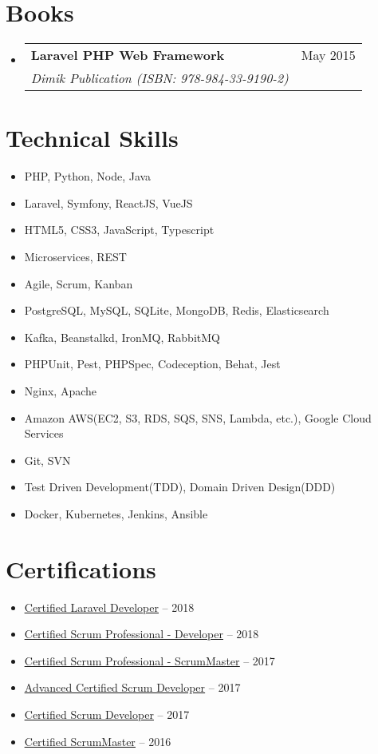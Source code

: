 \documentclass[a4paper,11pt]{article}
\makeatletter
\newcommand{\resumeItem}[1]{
  \item\small{
    {#1 \vspace{-2pt}}
  }
}
\newcommand{\resumeSubheading}[4]{
  \vspace{-2pt}\item
    \begin{tabular*}{0.97\textwidth}[t]{l@{\extracolsep{\fill}}r}
      \textbf{\large #1} \small{\textit{#4}} & #2 \\
      \textit{#3}
    \end{tabular*}\vspace{-7pt}
}
\newcommand{\resumeSubHeadingListStart}{\begin{itemize}[leftmargin=0.15in, label={}]}
\newcommand{\resumeSubHeadingListEnd}{\end{itemize}}
\newcommand{\resumeItemListStart}{\begin{itemize}}
\newcommand{\resumeItemListEnd}{\end{itemize}\vspace{-5pt}}
\makeatother
\begin{document}
\section{Books}
  \resumeSubHeadingListStart    
    \resumeSubheading
      {\textbf{Laravel PHP Web Framework}}{May 2015}
      {Dimik Publication (ISBN: 978-984-33-9190-2)} {}
  \resumeSubHeadingListEnd


\section{Technical Skills}
 \begin{itemize}[leftmargin=0.15in, label={}]    
    \resumeItemListStart
      \resumeItem{PHP, Python, Node, Java}
      \resumeItem{Laravel, Symfony, ReactJS, VueJS}
      \resumeItem{HTML5, CSS3, JavaScript, Typescript}
      \resumeItem{Microservices, REST}
      \resumeItem{Agile, Scrum, Kanban}
      \resumeItem{PostgreSQL, MySQL, SQLite, MongoDB, Redis, Elasticsearch}
      \resumeItem{Kafka, Beanstalkd, IronMQ, RabbitMQ}
      \resumeItem{PHPUnit, Pest, PHPSpec, Codeception, Behat, Jest}
      \resumeItem{Nginx, Apache}
      \resumeItem{Amazon AWS(EC2, S3, RDS, SQS, SNS, Lambda, etc.), Google Cloud Services}
      \resumeItem{Git, SVN}
      \resumeItem{Test Driven Development(TDD), Domain Driven Design(DDD)}
      \resumeItem{Docker, Kubernetes, Jenkins, Ansible}
    \resumeItemListEnd
 \end{itemize}
 

\section{Certifications}
  \begin{itemize}[leftmargin=0.15in, label={}]
      \resumeItemListStart
        \resumeItem{\href{https://exam.laravelcert.com/is/nuruzzaman-milon/certified-since/2018-01-08}{\underline{Certified Laravel Developer}} -- 2018}
        \resumeItem{\href{https://bcert.me/swoqnnlks}{\underline{Certified Scrum Professional - Developer}} -- 2018}
        \resumeItem{\href{https://bcert.me/swajseym}{\underline{Certified Scrum Professional - ScrumMaster}} -- 2017}
        \resumeItem{\href{https://bcert.me/segniwpnm}{\underline{Advanced Certified Scrum Developer}} -- 2017}
        \resumeItem{\href{https://bcert.me/skctlvko}{\underline{Certified Scrum Developer}} -- 2017}
        \resumeItem{\href{https://bcert.me/snynrkpl}{\underline{Certified ScrumMaster}} -- 2016}
      \resumeItemListEnd
  \end{itemize}
\end{document}
